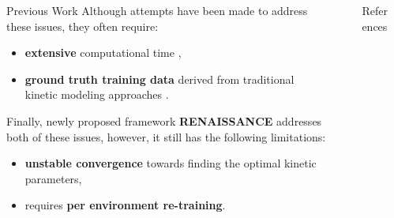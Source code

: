 \documentclass[final]{beamer}
\newlength{\sepwidth}
\newlength{\colwidth}
\newcommand{\separatorcolumn}{\begin{column}{\sepwidth}\end{column}}
\begin{document}
\begin{frame}[t]
\begin{columns}[t]
\begin{column}{\colwidth}
\begin{block}{Previous Work}
        Although attempts have been made to address these issues, they often require:
        \begin{itemize}
            \item \textbf{extensive} computational time \cite{kfit},
            \item \textbf{ground truth training data} derived from traditional kinetic modeling approaches \cite{ischrunk,miskovic2019uncertainty,gans}.
        \end{itemize}
    Finally, newly proposed framework \textbf{RENAISSANCE} \cite{rennaissance} addresses both of these issues,
    however, it still has the following limitations:
    \begin{itemize}
        \item \textbf{unstable convergence} towards finding the optimal kinetic parameters,
        \item requires \textbf{ per environment re-training}.
    \end{itemize}

    \end{block}

\end{column}

\separatorcolumn
\begin{column}{\colwidth}

    
    \begin{block}{References}
        \nocite{*}
        \small{}
    \end{block}

\end{column}
\separatorcolumn

\end{columns}
\end{frame}
\end{document}
